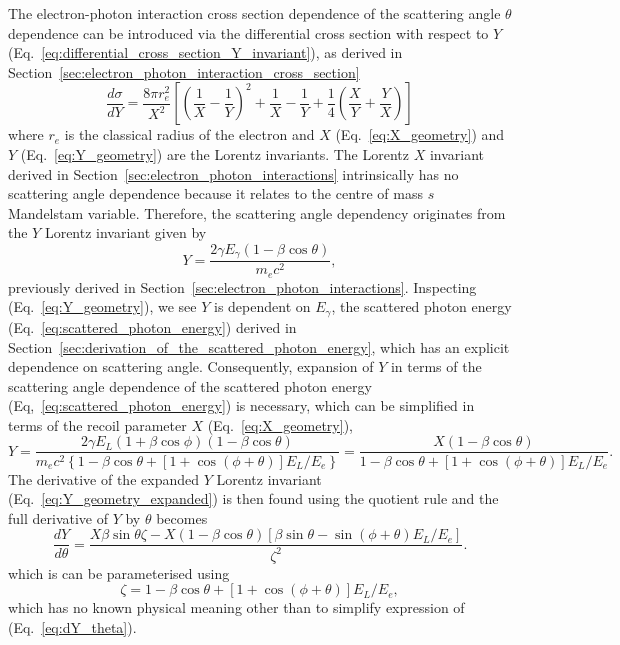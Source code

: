 \documentclass[../main.tex]{subfiles}
\begin{document}
The electron-photon interaction cross section dependence of the scattering angle $\theta$ dependence can be introduced via the differential cross section with respect to $Y$ (Eq.~\ref{eq:differential_cross_section_Y_invariant}), as derived in Section~\ref{sec:electron_photon_interaction_cross_section}
\begin{equation*}
\frac{d\sigma}{dY} = \frac{8\pi r_{e}^{2}}{X^{2}}\left[\left(\frac{1}{X}-\frac{1}{Y}\right)^{2}+\frac{1}{X}-\frac{1}{Y}+\frac{1}{4}\left(\frac{X}{Y}+\frac{Y}{X}\right)\right]
\end{equation*}
where $r_{e}$ is the classical radius of the electron and $X$ (Eq.~\ref{eq:X_geometry}) and $Y$ (Eq.~\ref{eq:Y_geometry}) are the Lorentz invariants. The Lorentz $X$ invariant derived in Section~\ref{sec:electron_photon_interactions} intrinsically has no scattering angle dependence because it relates to the centre of mass $s$ Mandelstam variable. Therefore, the scattering angle dependency originates from the $Y$ Lorentz invariant given by
\begin{equation*}
Y = \frac{2\gamma E_{\gamma}\left(1-\beta\cos\theta\right)}{m_{e}c^{2}},    
\end{equation*}
previously derived in Section~\ref{sec:electron_photon_interactions}. Inspecting (Eq.~\ref{eq:Y_geometry}), we see $Y$ is dependent on $E_{\gamma}$, the scattered photon energy (Eq.~\ref{eq:scattered_photon_energy}) derived in Section~\ref{sec:derivation_of_the_scattered_photon_energy}, which has an explicit dependence on scattering angle. Consequently, expansion of $Y$ in terms of the scattering angle dependence of the scattered photon energy (Eq,~\ref{eq:scattered_photon_energy}) is necessary, which can be simplified in terms of the recoil parameter $X$ (Eq.~\ref{eq:X_geometry}),
\begin{equation}
Y = \frac{2\gamma E_{L}\left(1+\beta\cos\phi\right)\left(1-\beta\cos\theta\right)}{m_{e}c^{2}\left\{1-\beta\cos\theta+\left[1+\cos\left(\phi+\theta\right)\right]E_{L}/E_{e}\right\}} = \frac{X\left(1-\beta\cos\theta\right)}{1-\beta\cos\theta+\left[1+\cos\left(\phi+\theta\right)\right]E_{L}/E_{e}}.
\label{eq:Y_geometry_expanded}
\end{equation}
The derivative of the expanded $Y$ Lorentz invariant (Eq.~\ref{eq:Y_geometry_expanded}) is then found using the quotient rule and the full derivative of $Y$ by $\theta$ becomes
\begin{equation}
\frac{dY}{d\theta} = \frac{X\beta\sin\theta\zeta-X\left(1-\beta\cos\theta\right)\left[\beta\sin\theta-\sin\left(\phi+\theta\right)E_{L}/E_{e}\right]}{\zeta^{2}}.
\label{eq:dY_dtheta}
\end{equation}
which is can be parameterised using
\begin{equation}
\zeta = 1-\beta\cos\theta+\left[1+\cos\left(\phi+\theta\right)\right]E_{L}/E_{e},
\label{eq:zeta_simplification}
\end{equation}
which has no known physical meaning other than to simplify expression of (Eq.~\ref{eq:dY_theta}).
\end{document}
